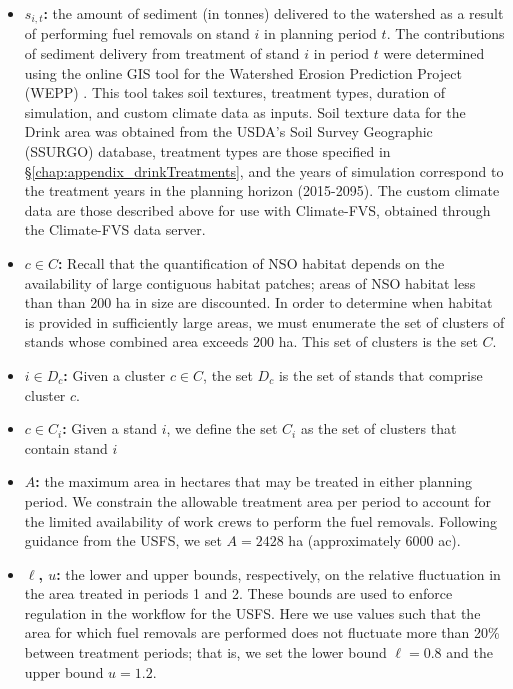 \begin{itemize}
\item \textbf{$s_{i,t}$:} the amount of sediment (in tonnes) delivered to the watershed as a result of performing fuel removals on stand $i$ in planning period $t$. The contributions of sediment delivery from treatment of stand $i$ in period $t$ were determined using the online GIS tool for the Watershed Erosion Prediction Project (WEPP) \cite{frankenberger2011development}. This tool takes soil textures, treatment types, duration of simulation, and custom climate data as inputs. Soil texture data for the Drink area was obtained from the USDA's Soil Survey Geographic (SSURGO) database, treatment types are those specified in \S \ref{chap:appendix_drinkTreatments}, and the years of simulation correspond to the treatment years in the planning horizon (2015-2095). The custom climate data are those described above for use with Climate-FVS, obtained through the Climate-FVS data server.

\item \textbf{$c \in C$:} Recall that the quantification of NSO habitat depends on the availability of large contiguous habitat patches; areas of NSO habitat less than than 200 ha in size are discounted. In order to determine when habitat is provided in sufficiently large areas, we must enumerate the set of clusters of stands whose combined area exceeds 200 ha. This set of clusters is the set $C$.

\item \textbf{$i \in D_c$:} Given a cluster $c \in C$, the set $D_c$ is the set of stands that comprise cluster $c$.

\item \textbf{$c \in C_i$:} Given a stand $i$, we define the set $C_i$ as the set of clusters that contain stand $i$

\item \textbf{$A$:} the maximum area in hectares that may be treated in either planning period. We constrain the allowable treatment area per period to account for the limited availability of work crews to perform the fuel removals. Following guidance from the USFS, we set $A = 2428$ ha (approximately 6000 ac).

\item \textbf{$\ell$, $u$:} the lower and upper bounds, respectively, on the relative fluctuation in the area treated in periods 1 and 2. These bounds are used to enforce regulation in the workflow for the USFS. Here we use values such that the area for which fuel removals are performed does not fluctuate more than 20\% between treatment periods; that is, we set the lower bound $\ell = 0.8$ and the upper bound $u = 1.2$.
\end{itemize}

